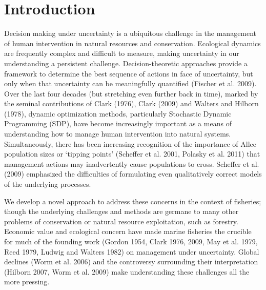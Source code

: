 \documentclass[author-year, 12pt,review]{components/elsarticle} %
\begin{document}
\section{Introduction}\label{introduction}

Decision making under uncertainty is a ubiquitous challenge in the
management of human intervention in natural resources and conservation.
Ecological dynamics are frequently complex and difficult to measure,
making uncertainty in our understanding a persistent challenge.
Decision-theoretic approaches provide a framework to determine the best
sequence of actions in face of uncertainty, but only when that
uncertainty can be meaningfully quantified (Fischer et al. 2009). Over
the last four decades (but stretching even further back in time), marked
by the seminal contributions of Clark (1976), Clark (2009) and Walters
and Hilborn (1978), dynamic optimization methods, particularly
Stochastic Dynamic Programming (SDP), have become increasingly important
as a means of understanding how to manage human intervention into
natural systems. Simultaneously, there has been increasing recognition
of the importance of Allee population sizes or `tipping points'
(Scheffer et al. 2001, Polasky et al. 2011) that management actions may
inadvertently cause populations to cross. Scheffer et al. (2009)
emphasized the difficulties of formulating even qualitatively correct
models of the underlying processes.

We develop a novel approach to address these concerns in the context of
fisheries; though the underlying challenges and methods are germane to
many other problems of conservation or natural resource exploitation,
such as forestry. Economic value and ecological concern have made marine
fisheries the crucible for much of the founding work (Gordon 1954, Clark
1976, 2009, May et al. 1979, Reed 1979, Ludwig and Walters 1982) on
management under uncertainty. Global declines (Worm et al. 2006) and the
controversy surrounding their interpretation (Hilborn 2007, Worm et al.
2009) make understanding these challenges all the more pressing.
\end{document}
